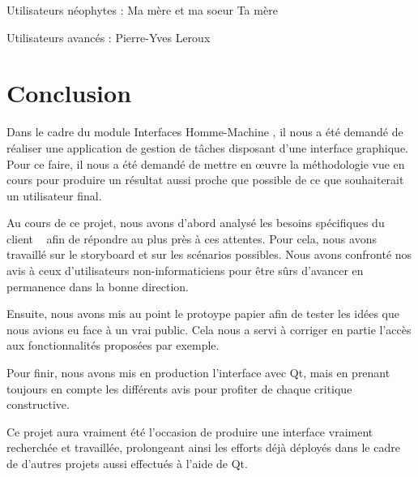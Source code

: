 	Utilisateurs néophytes :
		Ma mère et ma soeur
		Ta mère
		
	Utilisateurs avancés :
		Pierre-Yves
		Leroux

\chapter*{Conclusion}
	Dans le cadre du module \og Interfaces Homme-Machine \fg , il nous a été demandé de réaliser une application de gestion de tâches disposant d'une interface graphique. Pour ce faire, il nous a été demandé de mettre en {\oe}uvre la méthodologie vue en cours pour produire un résultat aussi proche que possible de ce que souhaiterait un utilisateur final.
	
	Au cours de ce projet, nous avons d'abord analysé les besoins spécifiques du \og client \fg~ afin de répondre au plus près à ces attentes. Pour cela, nous avons travaillé sur le storyboard et sur les scénarios possibles. Nous avons confronté nos avis à ceux d'utilisateurs non-informaticiens pour être sûrs d'avancer en permanence dans la bonne direction.
	
	Ensuite, nous avons mis au point le protoype papier afin de tester les idées que nous avions eu face à un vrai public. Cela nous a servi à corriger en partie l'accès aux fonctionnalités proposées par exemple.
	
	Pour finir, nous avons mis en production l'interface avec Qt, mais en prenant toujours en compte les différents avis pour profiter de chaque critique constructive.
	
	Ce projet aura vraiment été l'occasion de produire une interface vraiment recherchée et travaillée, prolongeant ainsi les efforts déjà déployés dans le cadre de d'autres projets aussi effectués à l'aide de Qt.
